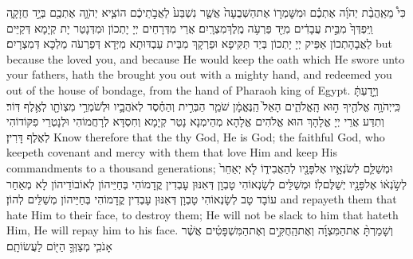 {כִּי֩ מֵאַֽהֲבַ֨ת יְהֹוָ֜ה אֶתְכֶ֗ם וּמִשׇּׁמְר֤וֹ אֶת\maqqaf הַשְּׁבֻעָה֙ אֲשֶׁ֤ר נִשְׁבַּע֙ לַאֲבֹ֣תֵיכֶ֔ם הוֹצִ֧יא יְהֹוָ֛ה אֶתְכֶ֖ם בְּיָ֣ד חֲזָקָ֑ה וַֽיִּפְדְּךָ֙ מִבֵּ֣ית עֲבָדִ֔ים מִיַּ֖ד פַּרְעֹ֥ה מֶֽלֶךְ\maqqaf מִצְרָֽיִם׃}
{אֲרֵי מִדְּרָחֵים יְיָ יָתְכוֹן וּמִדְּנָטַר יָת קְיָמָא דְּקַיֵּים לַאֲבָהָתְכוֹן אַפֵּיק יְיָ יָתְכוֹן בְּיַד תַּקִּיפָא וּפַרְקָךְ מִבֵּית עַבְדּוּתָא מִיְּדָא דְּפַרְעֹה מַלְכָּא דְּמִצְרָיִם׃}
{but because the \lord\space loved you, and because He would keep the oath which He swore unto your fathers, hath the \lord\space brought you out with a mighty hand, and redeemed you out of the house of bondage, from the hand of Pharaoh king of Egypt.}{}
{וְיָ֣דַעְתָּ֔ כִּֽי\maqqaf יְהֹוָ֥ה אֱלֹהֶ֖יךָ ה֣וּא הָֽאֱלֹהִ֑ים הָאֵל֙ הַֽנֶּאֱמָ֔ן שֹׁמֵ֧ר הַבְּרִ֣ית וְהַחֶ֗סֶד לְאֹהֲבָ֛יו וּלְשֹׁמְרֵ֥י מִצְוֺתָ֖ו לְאֶ֥לֶף דּֽוֹר׃}
{וְתִדַּע אֲרֵי יְיָ אֱלָהָךְ הוּא אֱלֹהִים אֱלָהָא מְהֵימְנָא נָטַר קְיָמָא וְחִסְדָּא לְרָחֲמוֹהִי וּלְנָטְרֵי פִקּוֹדוֹהִי לְאֶלֶף דָּרִין׃}
{Know therefore that the \lord\space thy God, He is God; the faithful God, who keepeth covenant and mercy with them that love Him and keep His commandments to a thousand generations;}{}
{וּמְשַׁלֵּ֧ם לְשֹׂנְאָ֛יו אֶל\maqqaf פָּנָ֖יו לְהַאֲבִיד֑וֹ לֹ֤א יְאַחֵר֙ לְשֹׂ֣נְא֔וֹ אֶל\maqqaf פָּנָ֖יו יְשַׁלֶּם\maqqaf לֽוֹ׃}
{וּמְשַׁלֵּים לְשָׂנְאוֹהִי טָבְוָן דְּאִנּוּן עָבְדִין קֳדָמוֹהִי בְּחַיֵּיהוֹן לְאוֹבוֹדֵיהוֹן לָא מְאַחַר עוֹבָד טָב לְשָׂנְאוֹהִי טָבְוָן דְּאִנּוּן עָבְדִין קֳדָמוֹהִי בְּחַיֵּיהוֹן מְשַׁלֵּים לְהוֹן׃}
{and repayeth them that hate Him to their face, to destroy them; He will not be slack to him that hateth Him, He will repay him to his face.}{}
{וְשָׁמַרְתָּ֨ אֶת\maqqaf הַמִּצְוָ֜ה וְאֶת\maqqaf הַֽחֻקִּ֣ים וְאֶת\maqqaf הַמִּשְׁפָּטִ֗ים אֲשֶׁ֨ר אָנֹכִ֧י מְצַוְּךָ֛ הַיּ֖וֹם לַעֲשׂוֹתָֽם׃ \petucha }
